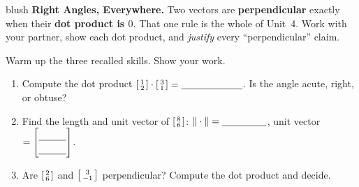 \documentclass[10pt]{article}
\begin{document}
\namepartnerperiod

\vspace{0.10in}

\begin{headlinebox}{blush}
\small\textbf{Right Angles, Everywhere.} Two vectors are \textbf{perpendicular} exactly when their
\textbf{dot product is $0$}. That one rule is the whole of Unit~4. Work with your partner, show each
dot product, and \emph{justify} every ``perpendicular'' claim.
\end{headlinebox}

\vspace{0.10in}

\begin{tcolorbox}[colback=white, colframe=black!40, title=\textbf{Tier R --- Remediate},
    fonttitle=\bfseries, arc=1.5mm, left=3mm, right=3mm, top=2mm, bottom=2mm, breakable]
Warm up the three recalled skills. Show your work.
\begin{enumerate}[leftmargin=1.7em, itemsep=8pt]
  \item Compute the dot product
        $\begin{bsmallmatrix} 1\\2 \end{bsmallmatrix}\cdot\begin{bsmallmatrix} 3\\1 \end{bsmallmatrix}
        = \blank{2.2cm}$. Is the angle acute, right, or obtuse? \; \blank{2.2cm}
  \item Find the length and unit vector of $\begin{bsmallmatrix} 8\\6 \end{bsmallmatrix}$:
        \quad $\|\cdot\| = \blank{1.6cm}$, \quad
        unit vector $= \begin{bmatrix}\rule{0pt}{1.0em}\blank{1.0cm}\\[2pt]\blank{1.0cm}\end{bmatrix}$.
  \item Are $\begin{bsmallmatrix} 2\\6 \end{bsmallmatrix}$ and $\begin{bsmallmatrix} 3\\-1 \end{bsmallmatrix}$
        perpendicular? Compute the dot product and decide. \; \blank{3.0cm}
\end{enumerate}
\end{tcolorbox}
\end{document}
